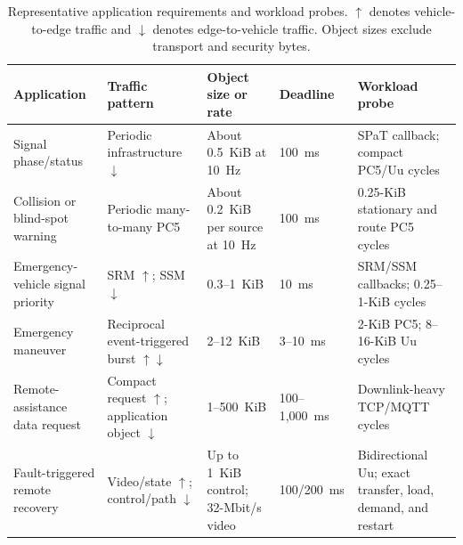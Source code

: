\begin{table}[t]
  \caption{Representative application requirements and workload probes.
  $\uparrow$ denotes vehicle-to-edge traffic and $\downarrow$ denotes
  edge-to-vehicle traffic. Object sizes exclude transport and security bytes.}
  \label{tab:application-envelopes}
  \centering
  \footnotesize
  \setlength{\tabcolsep}{2.5pt}
  \renewcommand{\arraystretch}{1.15}
  \begin{tabular}{@{}C{0.17\textwidth}C{0.20\textwidth}C{0.18\textwidth}C{0.11\textwidth}C{0.24\textwidth}@{}}
    \toprule
    Application & Traffic pattern & Object size or rate & Deadline & Workload probe \\
    \midrule
    Signal phase/status & Periodic infrastructure $\downarrow$ & About 0.5~KiB at 10~Hz & 100~ms & SPaT callback; compact PC5/Uu cycles \\
    Collision or blind-spot warning & Periodic many-to-many PC5 & About 0.2~KiB per source at 10~Hz & 100~ms & 0.25-KiB stationary and route PC5 cycles \\
    Emergency-vehicle signal priority & SRM $\uparrow$; SSM $\downarrow$ & 0.3--1~KiB & 10~ms & SRM/SSM callbacks; 0.25--1-KiB cycles \\
    Emergency maneuver & Reciprocal event-triggered burst $\uparrow\downarrow$ & 2--12~KiB & 3--10~ms & 2-KiB PC5; 8--16-KiB Uu cycles \\
    Remote-assistance data request & Compact request $\uparrow$; application object $\downarrow$ & 1--500~KiB & 100--1,000~ms & Downlink-heavy TCP/MQTT cycles \\
    Fault-triggered remote recovery & Video/state $\uparrow$; control/path $\downarrow$ & Up to 1~KiB control; 32-Mbit/s video & 100/200~ms & Bidirectional Uu; exact transfer, load, demand, and restart \\
    \bottomrule
  \end{tabular}
\end{table}

